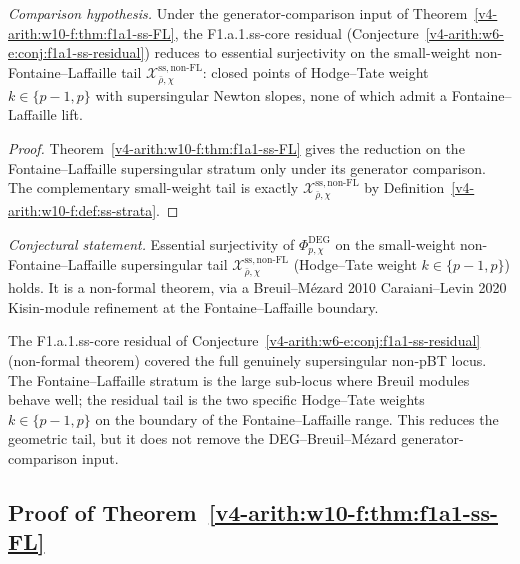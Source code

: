 \begin{corollary}
\label{v4-arith:w10-f:cor:ss-core-reduction}
\emph{Comparison hypothesis.} Under the generator-comparison input of
Theorem~\ref{v4-arith:w10-f:thm:f1a1-ss-FL}, the F1.a.1.ss-core residual
(Conjecture~\ref{v4-arith:w6-e:conj:f1a1-ss-residual}) reduces to essential
surjectivity on the small-weight non-Fontaine--Laffaille tail
\(\mathcal{X}^{\mathrm{ss,non\text{-}FL}}_{\bar\rho,\chi}\): closed
points of Hodge--Tate weight \(k\in\{p-1,p\}\) with supersingular
Newton slopes, none of which admit a Fontaine--Laffaille lift.
\end{corollary}

\begin{proof}
Theorem~\ref{v4-arith:w10-f:thm:f1a1-ss-FL} gives the reduction on the
Fontaine--Laffaille supersingular stratum only under its generator
comparison. The complementary small-weight tail is exactly
\(\mathcal{X}^{\mathrm{ss,non\text{-}FL}}_{\bar\rho,\chi}\) by
Definition~\ref{v4-arith:w10-f:def:ss-strata}.
\end{proof}

\begin{conjecture}
\label{v4-arith:w10-f:conj:ss-small-weight}
\emph{Conjectural statement.} Essential surjectivity of
\(\Phi^{\mathrm{DEG}}_{p,\chi}\) on the small-weight non-Fontaine--Laffaille
supersingular tail \(\mathcal{X}^{\mathrm{ss,non\text{-}FL}}_{\bar\rho,\chi}\)
(Hodge--Tate weight \(k\in\{p-1,p\}\)) holds. It is a non-formal theorem, via a
Breuil--M{\'e}zard 2010 Caraiani--Levin 2020 Kisin-module refinement
at the Fontaine--Laffaille boundary.
\end{conjecture}

\begin{remark}
\label{v4-arith:w10-f:rem:ss-tail-domain}
The F1.a.1.ss-core residual of Conjecture~\ref{v4-arith:w6-e:conj:f1a1-ss-residual}
(non-formal theorem) covered the full genuinely supersingular non-pBT locus.
The Fontaine--Laffaille stratum is the large sub-locus where Breuil
modules behave well; the residual tail is the two specific Hodge--Tate
weights \(k\in\{p-1,p\}\) on the boundary of the Fontaine--Laffaille
range. This reduces the geometric tail, but it does not remove the
DEG--Breuil--M{\'e}zard generator-comparison input.
\end{remark}

\subsection{Proof of Theorem~\ref{v4-arith:w10-f:thm:f1a1-ss-FL}}
\label{v4-arith:w10-f:obstruction-analysis-ss}


